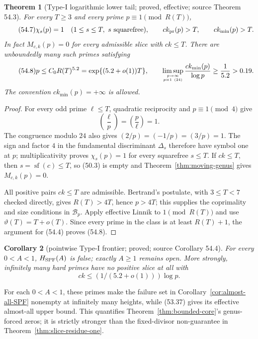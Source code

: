 \documentclass[10pt,reqno]{amsart}
\newtheorem{theorem}{Theorem}[section]
\newtheorem{corollary}[theorem]{Corollary}
\theoremstyle{definition}
\newcommand{\1}{\mathbf 1}
\begin{document}
\begin{theorem}[Type-I logarithmic lower tail; proved, effective; source
Theorem 54.3]\label{thm:slice-lower}
For every $T\geq3$ and every prime $p\equiv1\pmod {R(T)}$,
\begin{equation}\tag{54.7}
 \chi_s(p)=1\quad(1\leq s\leq T,\ s\ \mathrm{squarefree}),
 \qquad ck_{\rm pr}(p)>T,\qquad ck_{\min}(p)>T.
\end{equation}
In fact $M_{c,k}(p)=0$ for every admissible slice with $ck\leq T$.
There are unboundedly many such primes satisfying
\begin{equation}\tag{54.8}
 p\leq C_0R(T)^{5.2}=\exp\{(5.2+o(1))T\},\qquad
 \limsup_{p\to\infty\atop p\equiv1\ (24)}
 \frac{ck_{\min}(p)}{\log p}\geq\frac1{5.2}>0.19.
\end{equation}
The convention $ck_{\min}(p)=+\infty$ is allowed.
\end{theorem}
\begin{proof}
For every odd prime $\ell\leq T$, quadratic reciprocity and
$p\equiv1\pmod4$ give
\begin{equation}\tag{54.9}
 \left(\frac\ell p\right)=\left(\frac p\ell\right)=1.
\end{equation}
The congruence modulo $24$ also gives
$(2/p)=(-1/p)=(3/p)=1$.  The sign and factor $4$ in the fundamental
discriminant $\Delta_s$ therefore have symbol one at $p$; multiplicativity
proves $\chi_s(p)=1$ for every squarefree $s\leq T$.  If $ck\leq T$, then
$s=\operatorname {sf}(c)\leq T$, so (50.3) is empty and
Theorem~\ref{thm:moving-genus} gives $M_{c,k}(p)=0$.

All positive pairs $ck\leq T$ are admissible.  Bertrand's postulate, with
$3\leq T<7$ checked directly, gives $R(T)>4T$, hence $p>4T$; this supplies
the coprimality and size conditions in $\mathcal B_p$.  Apply effective
Linnik to $1\pmod {R(T)}$ and use $\vartheta(T)=T+o(T)$.  Since every prime
in the class is at least $R(T)+1$, the argument for (54.4) proves (54.8).
\end{proof}

\begin{corollary}[pointwise Type-I frontier; proved; source Corollary 54.4]
\label{cor:SPF-frontier}
For every $0<A<1$, $H_{\rm SPF}(A)$ is false; exactly $A\geq1$ remains
open.  More strongly, infinitely many hard primes have no positive slice at
all with
\begin{equation}\tag{54.10}
                  ck\leq(1/(5.2+o(1)))\log p.
\end{equation}
\end{corollary}
For each $0<A<1$, these primes make the failure set in
Corollary~\ref{cor:almost-all-SPF} nonempty at infinitely many heights,
while (53.37) gives its effective almost-all upper bound.  This quantifies
Theorem~\ref{thm:bounded-core}'s genus-forced zeros; it is strictly stronger
than the fixed-divisor non-guarantee in
Theorem~\ref{thm:slice-residue-one}.
\end{document}
